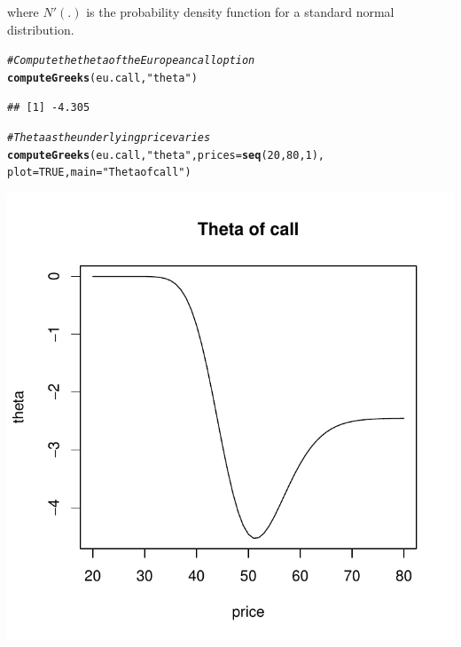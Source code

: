 \documentclass{article}\usepackage[]{graphicx}\usepackage[]{color}
\makeatletter
\def\maxwidth{ %
  \ifdim\Gin@nat@width>\linewidth
    \linewidth
  \else
    \Gin@nat@width
  \fi
}
\newcommand{\hlstr}[1]{\textcolor[rgb]{0.192,0.494,0.8}{#1}}%
\newcommand{\hlcom}[1]{\textcolor[rgb]{0.678,0.584,0.686}{\textit{#1}}}%
\newcommand{\hlkwd}[1]{\textcolor[rgb]{0.737,0.353,0.396}{\textbf{#1}}}%
\newenvironment{kframe}{%
 \def\at@end@of@kframe{}%
 \ifinner\ifhmode%
  \def\at@end@of@kframe{\end{minipage}}%
  \begin{minipage}{\columnwidth}%
 \fi\fi%
 \def\FrameCommand##1{\hskip\@totalleftmargin \hskip-\fboxsep
 \colorbox{shadecolor}{##1}\hskip-\fboxsep
     \hskip-\linewidth \hskip-\@totalleftmargin \hskip\columnwidth}%
 \MakeFramed {\advance\hsize-\width
   \@totalleftmargin\z@ \linewidth\hsize
   \@setminipage}}%
 {\par\unskip\endMakeFramed%
 \at@end@of@kframe}
\newenvironment{knitrout}{}{} %
\makeatother
\begin{document}
where $N'(.)$ is the probability density function for a standard normal distribution.

\begin{knitrout}
\color{fgcolor}\begin{kframe}
\begin{alltt}
\hlcom{# Compute the theta of the European call option}
\hlkwd{computeGreeks}(eu.call, \hlstr{"theta"})
\end{alltt}
\begin{verbatim}
## [1] -4.305
\end{verbatim}
\end{kframe}
\end{knitrout}


\begin{knitrout}
\color{fgcolor}\begin{kframe}
\begin{alltt}
\hlcom{# Theta as the underlying price varies}
\hlkwd{computeGreeks}(eu.call, \hlstr{"theta"}, prices = \hlkwd{seq}(20, 80, 1), 
              plot = TRUE, main=\hlstr{"Theta of call"})
\end{alltt}
\end{kframe}
\includegraphics[width=\maxwidth]{figure/unnamed-chunk-13} 

\end{knitrout}
\end{document}
